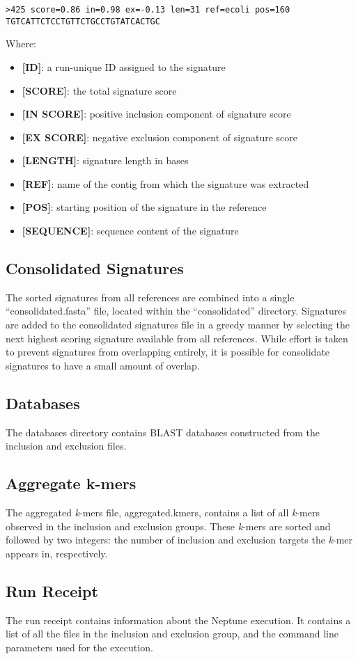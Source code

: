 \documentclass[a4paper,10pt]{article}
\begin{document}
\begin{verbatim}
>425 score=0.86 in=0.98 ex=-0.13 len=31 ref=ecoli pos=160
TGTCATTCTCCTGTTCTGCCTGTATCACTGC
\end{verbatim}

Where:

\begin{itemize}
  \item \textbf{[ID]}: a run-unique ID assigned to the signature
  \item \textbf{[SCORE]}: the total signature score
  \item \textbf{[IN SCORE]}: positive inclusion component of signature score
  \item \textbf{[EX SCORE]}: negative exclusion component of signature score
  \item \textbf{[LENGTH]}: signature length in bases
  \item \textbf{[REF]}: name of the contig from which the signature was extracted
  \item \textbf{[POS]}: starting position of the signature in the reference
  \item \textbf{[SEQUENCE]}: sequence content of the signature
\end{itemize}

\subsection{Consolidated Signatures}

The sorted signatures from all references are combined into a single ``consolidated.fasta'' file, located within the ``consolidated'' directory. Signatures are added to the consolidated signatures file in a greedy manner by selecting the next highest scoring signature available from all references. While effort is taken to prevent signatures from overlapping entirely, it is possible for consolidate signatures to have a small amount of overlap.

\subsection{Databases}

The databases directory contains BLAST databases constructed from the inclusion and exclusion files.

\subsection{Aggregate k-mers}

The aggregated \textit{k}-mers file, aggregated.kmers, contains a list of all \textit{k}-mers observed in the inclusion and exclusion groups. These \textit{k}-mers are sorted and followed by two integers: the number of inclusion and exclusion targets the \textit{k}-mer appears in, respectively.

\subsection{Run Receipt}

The run receipt contains information about the Neptune execution. It contains a list of all the files in the inclusion and exclusion group, and the command line parameters used for the execution.
\end{document}
